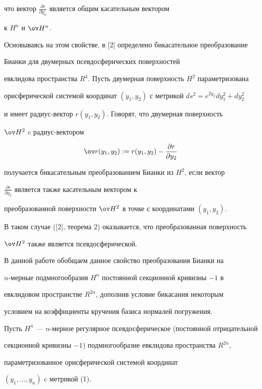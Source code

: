 что вектор $\frac{\partial r}{\partial y_n}$ является общим касательным вектором


к $H^n$ и $\ov H{}^n$.





Основываясь на этом свойстве, в [2] определено бикасательное преобразование 


Бианки для двумерных псевдосферических поверхностей 


евклидова пространства $R^4$. Пусть двумерная поверхность $H^2$ параметризована


орисферической системой координат $(y_1,y_2)$ с метрикой $ds^2=e^{2y_2}dy_1^2+dy_2^2$


и имеет радиус-вектор $r(y_1,y_2)$. Говорят, что двумерная поверхность 


$\ov H{}^2$ c радиус-вектором 


$$


\ov r(y_1,y_2):=r(y_1,y_2)- \frac{\partial r}{\partial y_2}


$$


получается бикасательным преобразованием Бианки из $H^2$, если вектор 


$\frac{\partial r }{\partial y_2}$ является также касательным вектором к 


преобразованной поверхности $\ov H{}^2$ в точке с координатами $(y_1,y_2)$.


В таком случае ([2], теорема 2) оказывается, что преобразованная поверхность 


$\ov H{}^2$ также является псевдосферической. 


В данной работе обобщаем данное свойство преобразования Бианки на 


$n$-мерные подмногообразия $H^n$ постоянной секционной кривизны $-1$ в 


евклидовом пространстве $R^{2n}$, дополнив условие бикасания некоторым 


условием на коэффициенты кручения базиса нормалей погружения.


	


Пусть $H^n$ --- $n$-мерное регулярное псевдосферическое (постоянной отрицательной 


секционной кривизны $-1$) подмногообразие евклидова пространства $R^{2n}$,


параметризованное орисферической системой координат 


$(y_1,\dotsc,y_n)$ c метрикой (1).


